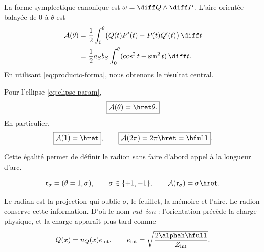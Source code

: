 La forme symplectique canonique est \(\omega=\diff Q\wedge\diff P\). L'aire
orientée balayée de \(0\) à \(\theta\) est
\begin{align}
\mathcal A(\theta)
&=\frac12\int_0^\theta
\bigl(Q(t)P'(t)-P(t)Q'(t)\bigr)\,\diff t\\
&=\frac12a_Sb_S\int_0^\theta
(\cos^2t+\sin^2t)\,\diff t.
\end{align}
En utilisant \eqref{eq:producto-forma}, nous obtenons le résultat central.

\begin{theorem}
Pour l'ellipse \eqref{eq:elipse-param},
\begin{equation}
\boxed{\mathcal A(\theta)=\hret\theta.}
\label{eq:area-theorem}
\end{equation}
En particulier,
\begin{equation}
\boxed{\mathcal A(1)=\hret},
\qquad
\boxed{\mathcal A(2\pi)=2\pi\hret=\hfull}.
\label{eq:area-radion-vuelta}
\end{equation}
\end{theorem}

Cette égalité permet de définir le radion sans faire d'abord appel à la longueur
d'arc.

\begin{definition}
\begin{equation}
\mathfrak r_\sigma=(\theta=1,\sigma),
\qquad \sigma\in\{+1,-1\},
\qquad
\mathcal A(\mathfrak r_\sigma)=\sigma\hret.
\label{eq:radion-oriented}
\end{equation}
\end{definition}

Le radian est la projection qui oublie \(\sigma\), le feuillet, la mémoire et
l'aire. Le radion conserve cette information. D'où le nom \emph{rad--ion} :
l'orientation précède la charge physique, et la charge apparaît plus tard comme
\[
Q(x)=n_Q(x)e_{\mathrm{int}},\qquad
e_{\mathrm{int}}=\sqrt{\frac{2\alphah\hfull}{Z_{\mathrm{int}}}}.
\]


